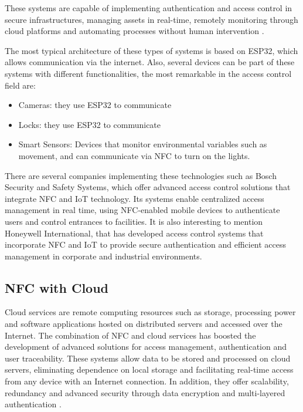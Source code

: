 These systems are capable of implementing authentication and access control in secure infrastructures, managing assets in real-time, remotely monitoring through cloud platforms and automating processes without human intervention \cite{ref34}.

The most typical architecture of these types of systems is based on ESP32, which allows communication via the internet. Also, several devices can be part of these systems with different functionalities, the most remarkable in the access control field are:
\begin{itemize}
	\item Cameras: they use ESP32 to communicate
	\item Locks: they use ESP32 to communicate
	\item Smart Sensors: Devices that monitor environmental variables such as movement, and can communicate via NFC to turn on the lights.
\end{itemize}

There are several companies implementing these technologies such as Bosch Security and Safety Systems, which offer advanced access control solutions that integrate NFC and IoT technology. Its systems enable centralized access management in real time, using NFC-enabled mobile devices to authenticate users and control entrances to facilities. It is also interesting to mention Honeywell International, that has developed access control systems that incorporate NFC and IoT to provide secure authentication and efficient access management in corporate and industrial environments.

\subsection{NFC with Cloud}

Cloud services are remote computing resources such as storage, processing power and software applications hosted on distributed servers and accessed over the Internet. The combination of NFC and cloud services has boosted the development of advanced solutions for access management, authentication and user traceability. These systems allow data to be stored and processed on cloud servers, eliminating dependence on local storage and facilitating real-time access from any device with an Internet connection. In addition, they offer scalability, redundancy and advanced security through data encryption and multi-layered authentication \cite{ref35}.


